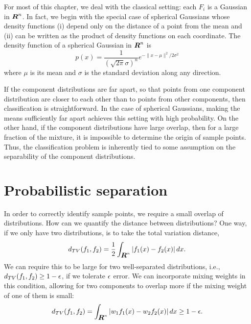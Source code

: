 \documentclass{book}
\newtheorem{exercise}{Exercise}
\numberwithin{exercise}{chapter}
\begin{document}
For most of this chapter, we deal with the classical setting:
each $F_i$ is a Gaussian in $\mbox{\mbox{\boldmath $R$}}^n$.  In fact, we begin with the special case of
spherical Gaussians whose density functions (i) depend only on
the distance of a point from the mean and (ii)
can be written as the product of density functions on
each coordinate. The density function of a spherical Gaussian in $\mbox{\mbox{\boldmath $R$}}^n$ is
\[
p(x) = \frac{1}{(\sqrt{2\pi}\sigma)^n}e^{-\|x-\mu\|^2/2\sigma^2}
\]
where $\mu$ is its mean and $\sigma$ is the standard deviation along any direction.





If the component distributions are far apart, so that points from one component distribution
are closer to each other than to points from other components, then classification
is straightforward. In the case of spherical Gaussians, making the means sufficiently
far apart achieves this setting with high probability. On the other hand, if the
component
distributions have large overlap, then for a large fraction of the mixture, it is impossible
to determine the origin of sample points. Thus, the classification problem is inherently tied to
some assumption on the separability of the component distributions.

\section{Probabilistic separation}

In order to correctly identify sample points, we require a small
overlap of distributions.  How can we quantify the distance between
distributions?  One way, if we only have two distributions, is to take
the total variation distance,
\[
d_{TV}(f_1,f_2) = \frac{1}{2}\int_{\mbox{\mbox{\boldmath $R$}}^n} |f_1(x)-f_2(x)|\, dx.
\]
We can require this to be large for two well-separated distributions, i.e.,
$d_{TV}(f_1,f_2) \ge 1-\epsilon$, if we tolerate $\epsilon$ error. We can incorporate
mixing weights in this condition, allowing for two components to overlap more if the mixing weight of one of them is small:
\[
d_{TV}(f_1, f_2) = \int_{\mbox{\mbox{\boldmath $R$}}^n} |w_1f_1(x)- w_2f_2(x)| \, dx \ge 1-\epsilon.
\]
\end{document}
